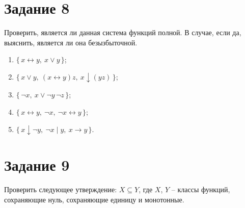 \documentclass[a4paper,12pt,oneside]{article}
\newcommand{\Task}[1]{\section*{\normalfont\bfseries Задание #1}}
\newcommand{\NOR}{\downarrow}
\newcommand{\NAND}{\mid}
\begin{document}
\Task{8}
Проверить, является ли данная система функций полной. В случае, если да, выяснить, является ли она безызбыточной.
\begin{enumerate}[label=\alph*)]
\item $\{\,x \leftrightarrow y,\ x \lor y\,\}$;
\item $\{\,x \lor y,\ (x \leftrightarrow y)z,\ x \NOR (yz)\,\}$;
\item $\{\,\neg x,\ x \lor \neg y\,\neg z\,\}$;
\item $\{\,x \leftrightarrow y,\ \neg x,\ \neg x \leftrightarrow y\,\}$;
\item $\{\,x \NOR \neg y,\ \neg x \NAND y,\ x \to y\,\}$.
\end{enumerate}

\Task{9}
Проверить следующее утверждение: $X \subseteq Y$, где $X$, $Y$ – классы функций, сохраняющие нуль, сохраняющие единицу и монотонные.
\end{document}
